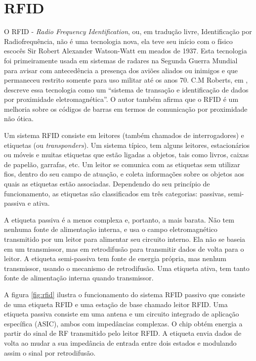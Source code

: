 \section{RFID}

O RFID - \emph{Radio Frequency Identification}, ou, em tradução livre,
Identificação por Radiofrequência, não é uma tecnologia nova, ela
teve seu início com o físico escocês Sir Robert Alexander Watson-Watt
em meados de 1937\cite{nemoto2012}. Esta tecnologia foi primeiramente
usada em sistemas de radares na Segunda Guerra Mundial para avisar
com antecedência a presença dos aviões aliados ou inimigos e que permaneceu
restrito somente para uso militar até os anos 70. C.M Roberts, em
\cite{Roberts2006}, descreve essa tecnologia como um ``sistema de
transação e identificação de dados por proximidade eletromagnética''.
O autor também afirma que o RFID é um melhoria sobre os códigos de
barras em termos de comunicação por proximidade não ótica.

Um sistema RFID consiste em leitores (também chamados de interrogadores)
e etiquetas (ou \emph{transponders}). Um sistema típico, tem alguns
leitores, estacionários ou móveis e muitas etiquetas que estão ligadas
a objetos, tais como livros, caixas de papelão, garrafas, etc\cite{Chawla2007}.
Um leitor se comunica com as etiquetas sem utilizar fios, dentro do
seu campo de atuação, e coleta informações sobre os objetos aos quais
as etiquetas estão associadas. Dependendo do seu princípio de funcionamento,
as etiquetas são classificados em três categorias: passivas, semi-passiva
e ativa.

A etiqueta passiva é a menos complexa e, portanto, a mais barata.
Não tem nenhuma fonte de alimentação interna, e usa o campo eletromagnético
transmitido por um leitor para alimentar seu circuito interno. Ela
não se baseia em um transmissor, mas em \textquotedbl{}retrodifusão\textquotedbl{}
para transmitir dados de volta para o leitor. A etiqueta semi-passiva
tem fonte de energia própria, mas nenhum transmissor, usando o mecanismo
de \textquotedbl{}retrodifusão. Uma etiqueta ativa, tem tanto fonte
de alimentação interna quando transmissor\cite{Chawla2007}.

A figura \ref{fig:rfid} ilustra o funcionamento do sistema RFID passivo
que consiste de uma etiqueta RFID e uma estação de base chamado \textquotedbl{}leitor
RFID\textquotedbl{}. Uma etiqueta passiva consiste em uma antena e
um circuito integrado de aplicação específica (ASIC), ambos com impedâncias
complexas. O chip obtém energia a partir do sinal de RF transmitido
pelo leitor RFID. A etiqueta envia dados de volta ao mudar a sua impedância
de entrada entre dois estados e modulando assim o sinal por \textquotedbl{}retrodifusão\textquotedbl{}. 

